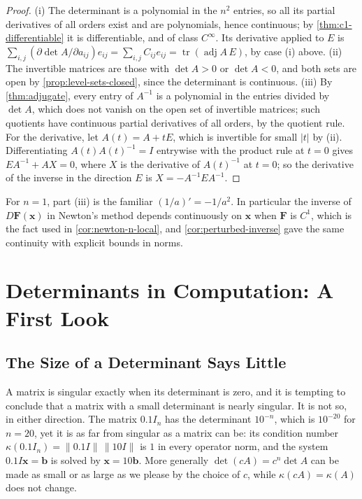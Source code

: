 \begin{proof}
(i) The determinant is a polynomial in the $n^2$ entries, so all its partial derivatives of all orders exist and are polynomials, hence continuous; by \cref{thm:c1-differentiable} it is differentiable, and of class $C^\infty$. Its derivative applied to $E$ is $\sum_{i,j}(\partial\det A/\partial a_{ij})e_{ij}=\sum_{i,j}C_{ij}e_{ij}=\operatorname{tr}(\operatorname{adj}A\,E)$, by case (i) above. (ii) The invertible matrices are those with $\det A>0$ or $\det A<0$, and both sets are open by \cref{prop:level-sets-closed}, since the determinant is continuous. (iii) By \cref{thm:adjugate}, every entry of $A^{-1}$ is a polynomial in the entries divided by $\det A$, which does not vanish on the open set of invertible matrices; such quotients have continuous partial derivatives of all orders, by the quotient rule. For the derivative, let $A(t)=A+tE$, which is invertible for small $|t|$ by (ii). Differentiating $A(t)A(t)^{-1}=I$ entrywise with the product rule at $t=0$ gives $EA^{-1}+AX=0$, where $X$ is the derivative of $A(t)^{-1}$ at $t=0$; so the derivative of the inverse in the direction $E$ is $X=-A^{-1}EA^{-1}$.
\end{proof}

For $n=1$, part (iii) is the familiar $(1/a)'=-1/a^2$. In particular the inverse of $D\mathbf F(\mathbf x)$ in Newton's method depends continuously on $\mathbf x$ when $\mathbf F$ is $C^1$, which is the fact used in \cref{cor:newton-n-local}, and \cref{cor:perturbed-inverse} gave the same continuity with explicit bounds in norms.

\section{Determinants in Computation: A First Look}
\label{sec:det-computation}

\subsection{The Size of a Determinant Says Little}

A matrix is singular exactly when its determinant is zero, and it is tempting to conclude that a matrix with a small determinant is nearly singular. It is not so, in either direction. The matrix $0.1I_n$ has the determinant $10^{-n}$, which is $10^{-20}$ for $n=20$, yet it is as far from singular as a matrix can be: its condition number $\kappa(0.1I_n)=\|0.1I\|\,\|10I\|$ is $1$ in every operator norm, and the system $0.1I\mathbf x=\mathbf b$ is solved by $\mathbf x=10\mathbf b$. More generally $\det(cA)=c^n\det A$ can be made as small or as large as we please by the choice of $c$, while $\kappa(cA)=\kappa(A)$ does not change.

